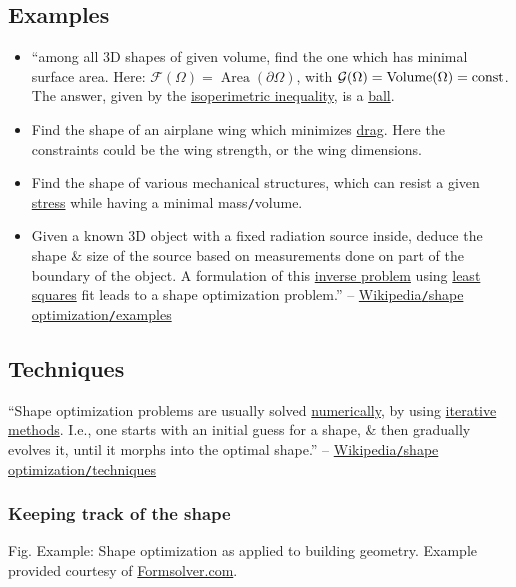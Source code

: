 \documentclass[oneside]{book}
\numberwithin{equation}{section}
\begin{document}
\subsection{Examples}
\begin{itemize}
	\item ``among all 3D shapes of given volume, find the one which has minimal surface area. Here: $\mathcal{F}(\Omega) = \operatorname{Area}(\partial\Omega)$, with $\mathcal{G}(\Omega) = \operatorname{Volume}(\Omega) = {\rm const}$. The answer, given by the \href{https://en.wikipedia.org/wiki/Isoperimetric_inequality}{isoperimetric inequality}, is a \href{https://en.wikipedia.org/wiki/Ball_(mathematics)}{ball}.
	\item Find the shape of an airplane wing which minimizes \href{https://en.wikipedia.org/wiki/Drag_(physics)}{drag}. Here the constraints could be the wing strength, or the wing dimensions.
	\item Find the shape of various mechanical structures, which can resist a given \href{https://en.wikipedia.org/wiki/Stress_(physics)}{stress} while having a minimal mass\texttt{/}volume.
	\item Given a known 3D object with a fixed radiation source inside, deduce the shape \& size of the source based on measurements done on part of the boundary of the object. A formulation of this \href{https://en.wikipedia.org/wiki/Inverse_problem}{inverse problem} using \href{https://en.wikipedia.org/wiki/Least-squares}{least squares} fit leads to a shape optimization problem.'' -- \href{https://en.wikipedia.org/wiki/Shape_optimization#Examples}{Wikipedia\texttt{/}shape optimization\texttt{/}examples}
\end{itemize}

\subsection{Techniques}
``Shape optimization problems are usually solved \href{https://en.wikipedia.org/wiki/Numerical_analysis}{numerically}, by using \href{https://en.wikipedia.org/wiki/Iterative_method}{iterative methods}. I.e., one starts with an initial guess for a shape, \& then gradually evolves it, until it morphs into the optimal shape.'' -- \href{https://en.wikipedia.org/wiki/Shape_optimization#Techniques}{Wikipedia\texttt{/}shape optimization\texttt{/}techniques}

\subsubsection{Keeping track of the shape}
\textsf{Fig. Example: Shape optimization as applied to building geometry. Example provided courtesy of \url{Formsolver.com}.}
\end{document}
